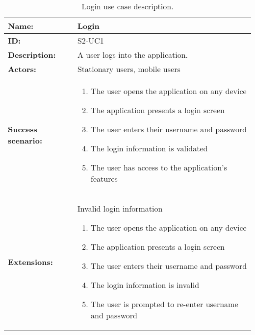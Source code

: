\begin{table}[htbp]
    \centering
    \begin{tabularx}{\textwidth}{lX}
        \toprule
        \textbf{Name:}  & Login \\ \midrule
        \textbf{ID:}    & S2-UC1 \\ \midrule
        \textbf{Description:} & A user logs into the application. \\ \midrule
        \textbf{Actors:} & Stationary users, mobile users \\ \midrule
        \textbf{Success scenario:} & 
        \begin{enumerate}
            \item The user opens the application on any device
            \item The application presents a login screen
            \item The user enters their username and password
            \item The login information is validated
            \item The user has access to the application's features
        \end{enumerate}
        \\ \midrule
        \textbf{Extensions:} & Invalid login information 
        \begin{enumerate}
            \item The user opens the application on any device
            \item The application presents a login screen
            \item The user enters their username and password
            \item The login information is invalid
            \item The user is prompted to re-enter username and password
        \end{enumerate}
        \\ \bottomrule
    \end{tabularx}
    \caption{Login use case description.}
    \label{tab:s2-uc1}
\end{table}

